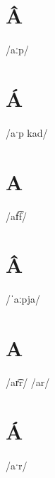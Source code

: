\documentclass[10pt,a4paper,twoside]{book}
\begin{document}
\section*{Â}

\begin{multicols}{3}
 {/aːp/} {}
\end{multicols}

\section*{Á}

\begin{multicols}{3}
 {/aˑp kad/} {}
\end{multicols}

\section*{A}

\begin{multicols}{3}
 {/af͡f/} {}
\end{multicols}

\section*{Â}

\begin{multicols}{3}
 {/ˈaːpja/} {}
\end{multicols}

\section*{A}

\begin{multicols}{3}
 {/ar͡r/} {}
 {/ar/} {}
\end{multicols}

\section*{Á}

\begin{multicols}{3}
 {/aˑr/} {}
\end{multicols}
\end{document}
